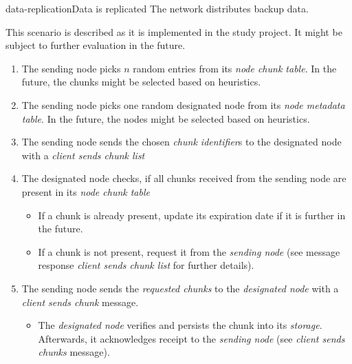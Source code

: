 \begin{scenario}{data-replication}{Data is replicated}
	The network distributes backup data.
	
	This scenario is described as it is implemented in the study project. It might be subject to further evaluation in the future.
	
	\begin{enumerate}
		\item The sending node picks $n$ random entries from its \emph{node chunk table}. In the future, the chunks might be selected based on heuristics.
		\item The sending node picks one random designated node from its \emph{node metadata table}. In the future, the nodes might be selected based on heuristics. %
		\item The sending node sends the chosen \emph{chunk identifier}s to the designated node with a \emph{client sends chunk list} %
		\item The designated node checks, if all chunks received from the sending node are present in its \emph{node chunk table}
			\begin{itemize}
				\item If a chunk is already present, update its expiration date if it is further in the future.
				\item If a chunk is not present, request it from the \emph{sending node} (see message response \emph{client sends chunk list} for further details).
			\end{itemize}
		\item The sending node sends the \emph{requested chunks} to the \emph{designated node} with a \emph{client sends chunk} message. %
			\begin{itemize}
				\item The \emph{designated node} verifies and persists the chunk into its \emph{storage}. Afterwards, it acknowledges receipt to the \emph{sending node} (see \emph{client sends chunks} message).
			\end{itemize}
	\end{enumerate}
\end{scenario}

